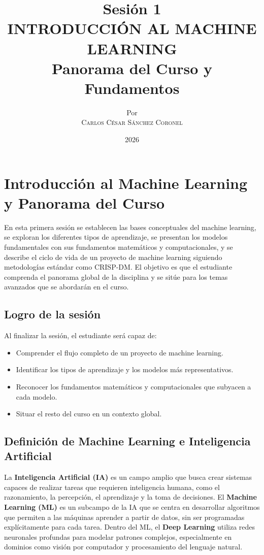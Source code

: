 \documentclass[12pt,a4paper,openany,oneside]{book}
\title{
    \textbf{Sesión 1} \\ 
    \Huge \textbf{INTRODUCCIÓN AL MACHINE LEARNING} \\
    \Large Panorama del Curso y Fundamentos
}
\author{
    \small Por \\ \vspace{0.2cm}
    \Large \textsc{Carlos César Sánchez Coronel}
}
\date{2026}
\begin{document}
\maketitle
\tableofcontents
{}

\chapter{Introducción al Machine Learning y Panorama del Curso}

En esta primera sesión se establecen las bases conceptuales del machine learning, se exploran los diferentes tipos de aprendizaje, se presentan los modelos fundamentales con sus fundamentos matemáticos y computacionales, y se describe el ciclo de vida de un proyecto de machine learning siguiendo metodologías estándar como CRISP-DM. El objetivo es que el estudiante comprenda el panorama global de la disciplina y se sitúe para los temas avanzados que se abordarán en el curso.

\section{Logro de la sesión}
Al finalizar la sesión, el estudiante será capaz de:
\begin{itemize}
    \item Comprender el flujo completo de un proyecto de machine learning.
    \item Identificar los tipos de aprendizaje y los modelos más representativos.
    \item Reconocer los fundamentos matemáticos y computacionales que subyacen a cada modelo.
    \item Situar el resto del curso en un contexto global.
\end{itemize}

\section{Definición de Machine Learning e Inteligencia Artificial}
La \textbf{Inteligencia Artificial (IA)} es un campo amplio que busca crear sistemas capaces de realizar tareas que requieren inteligencia humana, como el razonamiento, la percepción, el aprendizaje y la toma de decisiones. El \textbf{Machine Learning (ML)} es un subcampo de la IA que se centra en desarrollar algoritmos que permiten a las máquinas aprender a partir de datos, sin ser programadas explícitamente para cada tarea. Dentro del ML, el \textbf{Deep Learning} utiliza redes neuronales profundas para modelar patrones complejos, especialmente en dominios como visión por computador y procesamiento del lenguaje natural.
\end{document}

